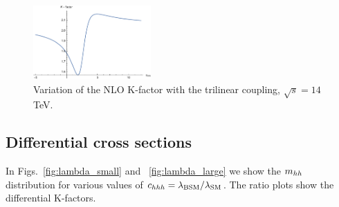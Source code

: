 \begin{figure}[htb]
  \centering
    \includegraphics[width=0.4\textwidth]{plots/Kfac_varlambda.pdf}
\caption{Variation of the NLO K-factor with the trilinear coupling, $\sqrt{s}=14$\,TeV.}
\label{fig:Kfacvariation}
\end{figure}


\subsection{Differential cross sections}

In Figs.~\ref{fig:lambda_small} and ~\ref{fig:lambda_large} we show the $m_{hh}$ distribution for various values of $c_{hhh}=\lambda_{\mathrm{BSM}}/\lambda_{\mathrm{SM}}$. 
The ratio plots show the differential K-factors. 

